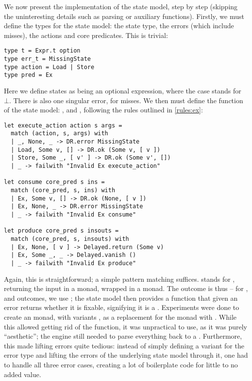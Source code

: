 We now present the implementation of the \Ex{} state model, step by step (skipping the uninteresting details such as parsing or auxiliary functions). Firstly, we must define the types for the state model: the state type, the errors (which include misses), the actions and core predicates. This is trivial: \begin{lstlisting}
type t = Expr.t option
type err_t = MissingState
type action = Load | Store
type pred = Ex
\end{lstlisting}
Here we define states as being an optional expression, where the  case stands for $\bot$. There is also one singular error, for misses. We then must define the function of the state model: \execac, \consume{} and \produce, following the rules outlined in \cref{rules:ex}: \begin{lstlisting}
let execute_action action s args =
  match (action, s, args) with
  | _, None, _ -> DR.error MissingState
  | Load, Some v, [] -> DR.ok (Some v, [ v ])
  | Store, Some _, [ v' ] -> DR.ok (Some v', [])
  | _ -> failwith "Invalid Ex execute_action"

let consume core_pred s ins =
  match (core_pred, s, ins) with
  | Ex, Some v, [] -> DR.ok (None, [ v ])
  | Ex, None, _ -> DR.error MissingState
  | _ -> failwith "Invalid Ex consume"

let produce core_pred s insouts =
  match (core_pred, s, insouts) with
  | Ex, None, [ v ] -> Delayed.return (Some v)
  | Ex, Some _, _ -> Delayed.vanish ()
  | _ -> failwith "Invalid Ex produce"
\end{lstlisting}
Again, this is straightforward; a simple pattern matching suffices.  stands for \mbox{}, returning the input in a  monad, wrapped in a  monad. The outcome is thus \Ok{} -- for \Err{}, \LFail{} and \Miss{} outcomes, we use ; the state model then provides a  function that given an error returns whether it is fixable, signifying it is a \Miss. Experiments were done to create an  monad, with variants , as a replacement for the  monad with . While this allowed getting rid of the  function, it was unpractical to use, as it was purely ``aesthetic''; the engine still needed to parse everything back to a . Furthermore, this made lifting errors quite tedious: instead of simply defining a variant  for the error type and lifting the errors of the underlying state model through it, one had to handle all three error cases, creating a lot of boilerplate code for little to no added value.

